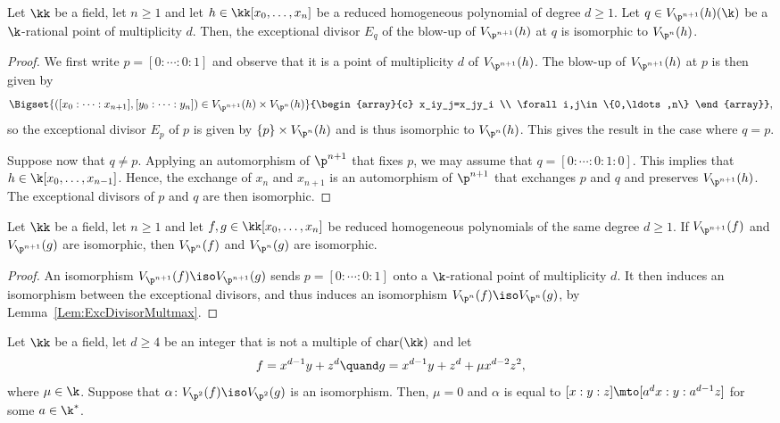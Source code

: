 \begin{lemma}\label{Lem:ExcDivisorMultmax}
Let $\kk$ be a field, let $n\ge 1$ and let $h\in \kk[x_0,\ldots,x_n]$ be a reduced homogeneous polynomial of degree $d\ge 1$. Let $q\in V_{\p^{n+1}}(h)(\k)$ be a $\k$-rational point of multiplicity $d$. Then, the exceptional divisor $E_q$ of the blow-up of $V_{\p^{n+1}}(h)$ at $q$ is isomorphic to $V_{\p^{n}}(h)$.
\end{lemma}
\begin{proof}
We first write $p=[0:\cdots:0:1]$ and observe that it is a point of multiplicity $d$ of $V_{\p^{n+1}}(h)$. The blow-up of $V_{\p^{n+1}}(h)$ at $p$ is then given by
\[
\Bigset{([x_0:\cdots:x_{n+1}],[y_0:\cdots:y_n])\in V_{\p^{n+1}}(h)\times V_{\p^{n}}(h)}
{\begin{array}{c}
x_iy_j=x_jy_i \\
\forall i,j\in \{0,\ldots,n\}
\end{array}},
\]
so the exceptional divisor $E_p$ of $p$ is given by $\{p\} \times V_{\p^n}(h)$ and is thus isomorphic to $V_{\p^n}(h)$. This gives the result in the case where $q=p$.

Suppose now that $q\neq p$. Applying an automorphism of $\p^{n+1}$ that fixes $p$, we may assume that $q=[0:\cdots:0:1:0]$. This implies that $h\in \k[x_0,\ldots,x_{n-1}]$. Hence, the exchange of $x_n$ and $x_{n+1}$ is an automorphism of $\p^{n+1}$ that exchanges $p$ and $q$ and preserves $V_{\p^{n+1}}(h)$. The exceptional divisors of $p$ and $q$ are then isomorphic.
\end{proof}

\begin{lemma}\label{Lem:IsoHypNNplus}
Let $\kk$ be a field, let $n\ge 1$ and let $f,g\in \kk[x_0,\ldots,x_n]$ be reduced
homogeneous polynomials of the same degree $d\ge 1$. If $V_{\p^{n+1}}(f)$ and $V_{\p^{n+1}}(g)$ are isomorphic, then $V_{\p^{n}}(f)$ and $V_{\p^{n}}(g)$ are isomorphic.
\end{lemma}
\begin{proof}
An isomorphism $V_{\p^{n+1}}(f)\iso V_{\p^{n+1}}(g)$ sends $p=[0:\cdots:0:1]$ onto a $\k$-rational point of multiplicity $d$. It then induces an isomorphism between the exceptional divisors, and thus induces an isomorphism $V_{\p^{n}}(f)\iso V_{\p^{n}}(g)$, by Lemma~\ref{Lem:ExcDivisorMultmax}.
\end{proof}

\begin{lemma}\label{LemmCurveD}
Let $\kk$ be a field, let $d\ge 4$ be an integer that is not a multiple of $\mathrm{char}(\kk)$ and let
\[f=x^{d-1}y+z^{d} \quand g=x^{d-1}y+z^{d}+\mu x^{d-2}z^2,\]
where $\mu\in \k$. Suppose that $\alpha\colon V_{\p^2}(f)\iso V_{\p^2}(g)$ is an isomorphism. Then, $\mu=0$ and $\alpha$ is equal to $[x:y:z]\mto [a^d x:y:a^{d-1} z]$ for some $a\in \k^*$.
\end{lemma}

